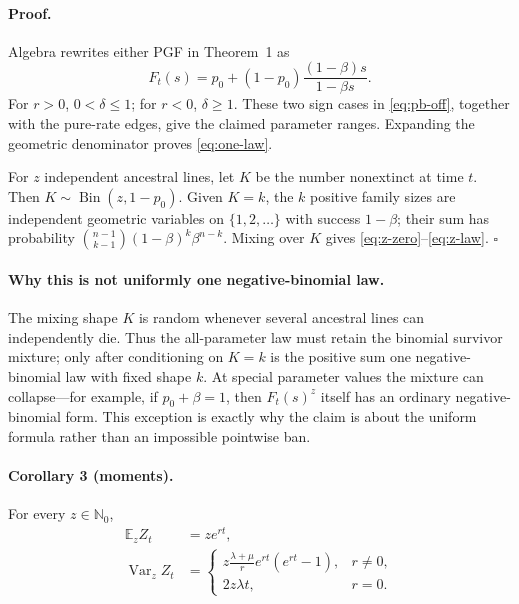 \documentclass[9pt]{extarticle}
\newcommand{\Nzero}{\mathbb N_0}
\newcommand{\Bin}{\operatorname{Bin}}
\begin{document}
\paragraph{Proof.}
Algebra rewrites either PGF in Theorem~1 as
\begin{equation}\label{eq:zmgeom}
 F_t(s)=p_0+(1-p_0)\frac{(1-\beta)s}{1-\beta s}.
\end{equation}
For $r>0$, $0<\delta\leq1$; for $r<0$, $\delta\geq1$.
These two sign cases in \eqref{eq:pb-off}, together with the pure-rate edges,
give the claimed parameter ranges.  Expanding the geometric denominator
proves \eqref{eq:one-law}.

For $z$ independent ancestral lines, let $K$ be the number nonextinct at
time $t$.  Then $K\sim\Bin(z,1-p_0)$.  Given $K=k$, the $k$ positive family
sizes are independent geometric variables on $\{1,2,\ldots\}$ with success
$1-\beta$; their sum has probability
$\binom{n-1}{k-1}(1-\beta)^k\beta^{n-k}$.  Mixing over $K$ gives
\eqref{eq:z-zero}--\eqref{eq:z-law}. \hfill$\square$

\paragraph{Why this is not uniformly one negative-binomial law.}
The mixing shape $K$ is random whenever several ancestral lines can
independently die.  Thus the all-parameter law must retain the binomial
survivor mixture; only after conditioning on $K=k$ is the positive sum one
negative-binomial law with fixed shape $k$.  At special parameter values the
mixture can collapse---for example, if $p_0+\beta=1$, then $F_t(s)^z$ itself
has an ordinary negative-binomial form.  This exception is exactly why the
claim is about the uniform formula rather than an impossible pointwise ban.

\paragraph{Corollary 3 (moments).}
For every $z\in\Nzero$,
\begin{align}
 \mathbb E_z Z_t&=ze^{rt}, \label{eq:mean}\\
 \operatorname{Var}_z Z_t&=
 \begin{cases}
 \displaystyle z\frac{\lambda+\mu}{r}e^{rt}(e^{rt}-1),&r\ne0,\\[4pt]
 2z\lambda t,&r=0.
 \end{cases} \label{eq:variance}
\end{align}
\end{document}

